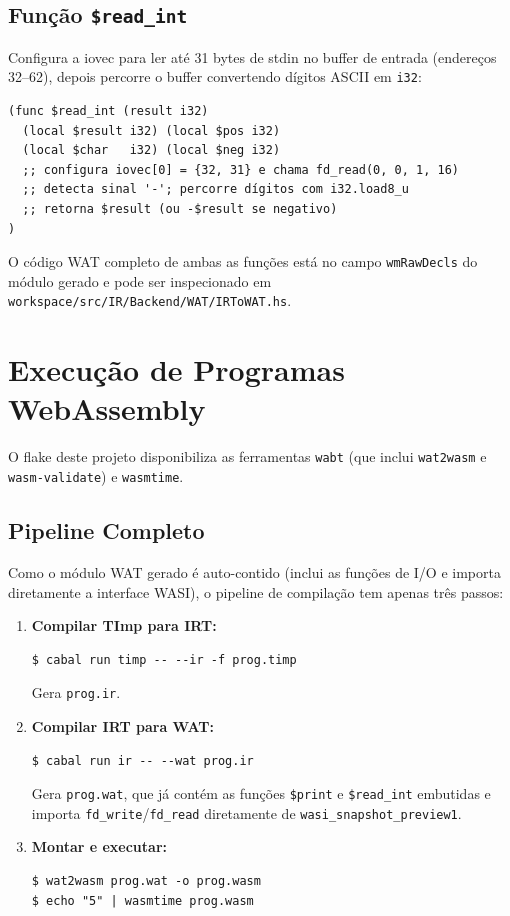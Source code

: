 \subsection{Função \texttt{\$read\_int}}

Configura a iovec para ler até 31 bytes de stdin no buffer de entrada (endereços
32–62), depois percorre o buffer convertendo dígitos ASCII em \texttt{i32}:

\begin{verbatim}
(func $read_int (result i32)
  (local $result i32) (local $pos i32)
  (local $char   i32) (local $neg i32)
  ;; configura iovec[0] = {32, 31} e chama fd_read(0, 0, 1, 16)
  ;; detecta sinal '-'; percorre dígitos com i32.load8_u
  ;; retorna $result (ou -$result se negativo)
)
\end{verbatim}

O código WAT completo de ambas as funções está no campo \texttt{wmRawDecls} do
módulo gerado e pode ser inspecionado em
\texttt{workspace/src/IR/Backend/WAT/IRToWAT.hs}.

\section{Execução de Programas WebAssembly}\label{sec:wat-exec}

O flake deste projeto disponibiliza as ferramentas \texttt{wabt} (que inclui
\texttt{wat2wasm} e \texttt{wasm-validate}) e \texttt{wasmtime}.

\subsection{Pipeline Completo}

Como o módulo WAT gerado é auto-contido (inclui as funções de I/O e importa
diretamente a interface WASI), o pipeline de compilação tem apenas três passos:

\begin{enumerate}
  \item \textbf{Compilar TImp para IRT:}
\begin{verbatim}
$ cabal run timp -- --ir -f prog.timp
\end{verbatim}
    Gera \texttt{prog.ir}.

  \item \textbf{Compilar IRT para WAT:}
\begin{verbatim}
$ cabal run ir -- --wat prog.ir
\end{verbatim}
    Gera \texttt{prog.wat}, que já contém as funções \texttt{\$print} e
    \texttt{\$read\_int} embutidas e importa
    \texttt{fd\_write}/\texttt{fd\_read}
    diretamente de \texttt{wasi\_snapshot\_preview1}.

  \item \textbf{Montar e executar:}
\begin{verbatim}
$ wat2wasm prog.wat -o prog.wasm
$ echo "5" | wasmtime prog.wasm
\end{verbatim}
\end{enumerate}

